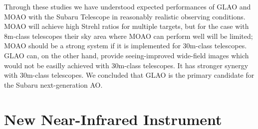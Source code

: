 \medskip

Through these studies we have understood expected performances of GLAO 
and MOAO with the Subaru Telescope in reasonably realistic observing
conditions. MOAO will achieve high Strehl ratios for multiple targets,
but for the case with 8m-class telescopes their sky area where MOAO can
perform well will be limited; MOAO should be a strong system if it is
implemented for 30m-class telescopes.
GLAO can, on the other hand, provide seeing-improved wide-field images
which would not be easilly achieved with 30m-class telescopes. It has 
stronger synergy with 30m-class telescopes. We concluded that GLAO
is the primary candidate for the Subaru next-generation AO.

\bigskip




\section{New Near-Infrared Instrument}

